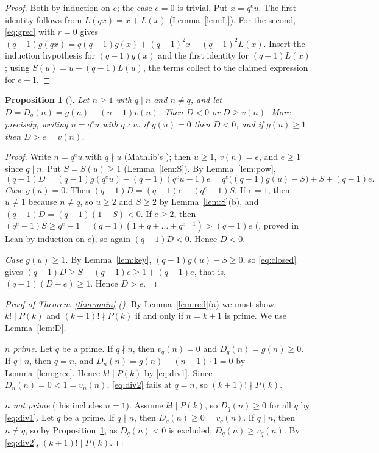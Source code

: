 \documentclass[11pt]{amsart}
\theoremstyle{plain}
\newtheorem{proposition}[theorem]{Proposition}
\theoremstyle{definition}
\begin{document}
\begin{proof}
Both by induction on $e$; the case $e=0$ is trivial. Put $x=q^eu$. The first identity follows from $L(qx)=x+L(x)$ (Lemma~\ref{lem:L}). For the second, \eqref{eq:grec} with $r=0$ gives $(q-1)g(qx)=q(q-1)g(x)+(q-1)^2x+(q-1)^2L(x)$. Insert the induction hypothesis for $(q-1)g(x)$ and the first identity for $(q-1)L(x)$; using $S(u)=u-(q-1)L(u)$, the terms collect to the claimed expression for $e+1$.
\end{proof}

\begin{proposition}[]\label{prop:dich}
Let $n\ge1$ with $q\mid n$ and $n\ne q$, and let $D=D_q(n)=g(n)-(n-1)v(n)$. Then $D<0$ or $D\ge v(n)$.
More precisely, writing $n=q^eu$ with $q\nmid u$: if $g(u)=0$ then $D<0$, and if $g(u)\ge1$ then $D>e=v(n)$.
\end{proposition}

\begin{proof}
Write $n=q^eu$ with $q\nmid u$ (Mathlib's ); then $u\ge1$, $v(n)=e$, and $e\ge1$ since $q\mid n$. Put $S=S(u)\ge1$ (Lemma~\ref{lem:S}). By Lemma~\ref{lem:pow},
\begin{equation}\label{eq:closed}
  (q-1)D=(q-1)g(q^eu)-(q-1)(q^eu-1)e=q^e\bigl((q-1)g(u)-S\bigr)+S+(q-1)e.
\end{equation}
\emph{Case $g(u)=0$.} Then $(q-1)D=(q-1)e-(q^e-1)S$. If $e=1$, then $u\ne1$ because $n\ne q$, so $u\ge2$ and $S\ge2$ by Lemma~\ref{lem:S}(b), and $(q-1)D=(q-1)(1-S)<0$. If $e\ge2$, then $(q^e-1)S\ge q^e-1=(q-1)(1+q+\dots+q^{e-1})>(q-1)e$ (, proved in Lean by induction on $e$), so again $(q-1)D<0$. Hence $D<0$.

\emph{Case $g(u)\ge1$.} By Lemma~\ref{lem:key}, $(q-1)g(u)-S\ge0$, so \eqref{eq:closed} gives $(q-1)D\ge S+(q-1)e\ge1+(q-1)e$, that is, $(q-1)(D-e)\ge1$. Hence $D>e$.
\end{proof}

\begin{proof}[Proof of Theorem~\ref{thm:main} ()]
By Lemma~\ref{lem:red}(a) we must show: $k!\mid P(k)$ and $(k+1)!\nmid P(k)$ if and only if $n=k+1$ is prime. We use Lemma~\ref{lem:D}.

\emph{$n$ prime.} Let $q$ be a prime. If $q\nmid n$, then $v_q(n)=0$ and $D_q(n)=g(n)\ge0$. If $q\mid n$, then $q=n$, and $D_n(n)=g(n)-(n-1)\cdot1=0$ by Lemma~\ref{lem:grec}. Hence $k!\mid P(k)$ by \eqref{eq:div1}. Since $D_n(n)=0<1=v_n(n)$, \eqref{eq:div2} fails at $q=n$, so $(k+1)!\nmid P(k)$.

\emph{$n$ not prime} (this includes $n=1$). Assume $k!\mid P(k)$, so $D_q(n)\ge0$ for all $q$ by \eqref{eq:div1}. Let $q$ be a prime. If $q\nmid n$, then $D_q(n)\ge0=v_q(n)$. If $q\mid n$, then $n\ne q$, so by Proposition~\ref{prop:dich}, as $D_q(n)<0$ is excluded, $D_q(n)\ge v_q(n)$. By \eqref{eq:div2}, $(k+1)!\mid P(k)$.
\end{proof}
\end{document}
